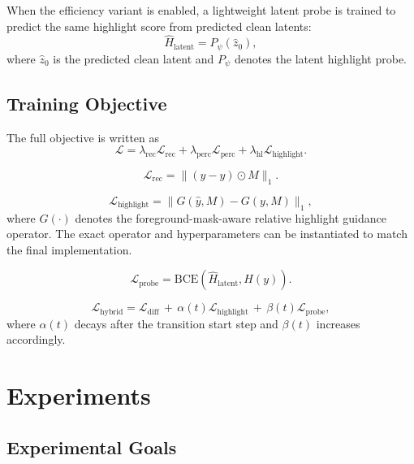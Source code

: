 \documentclass[UTF8,a4paper]{ctexart}
\begin{document}
When the efficiency variant is enabled, a lightweight latent probe is trained to predict the same highlight score from predicted clean latents:
\begin{equation}
\hat{H}_{\text{latent}} = P_\psi(\hat{z}_0),
\end{equation}
where $\hat{z}_0$ is the predicted clean latent and $P_\psi$ denotes the latent highlight probe.

\subsection{Training Objective}

The full objective is written as
\begin{equation}
\mathcal{L} = \lambda_{\text{rec}}\mathcal{L}_{\text{rec}} + \lambda_{\text{perc}}\mathcal{L}_{\text{perc}} + \lambda_{\text{hl}}\mathcal{L}_{\text{highlight}}.
\end{equation}

\begin{equation}
\mathcal{L}_{\text{rec}} = \| (\hat{y} - y) \odot M \|_1.
\end{equation}

\begin{equation}
\mathcal{L}_{\text{highlight}} = \| G(\hat{y}, M) - G(y, M) \|_1,
\end{equation}
where $G(\cdot)$ denotes the foreground-mask-aware relative highlight guidance operator. The exact operator and hyperparameters can be instantiated to match the final implementation.

\begin{equation}
\mathcal{L}_{\text{probe}}=
\text{BCE}\!\left(\hat{H}_{\text{latent}}, H(y)\right).
\end{equation}

\begin{equation}
\mathcal{L}_{\text{hybrid}}=
\mathcal{L}_{\text{diff}}
\,+\,\alpha(t)\mathcal{L}_{\text{highlight}}
\,+\,\beta(t)\mathcal{L}_{\text{probe}},
\end{equation}
where $\alpha(t)$ decays after the transition start step and $\beta(t)$ increases accordingly.

\section{Experiments}

\subsection{Experimental Goals}
\end{document}
